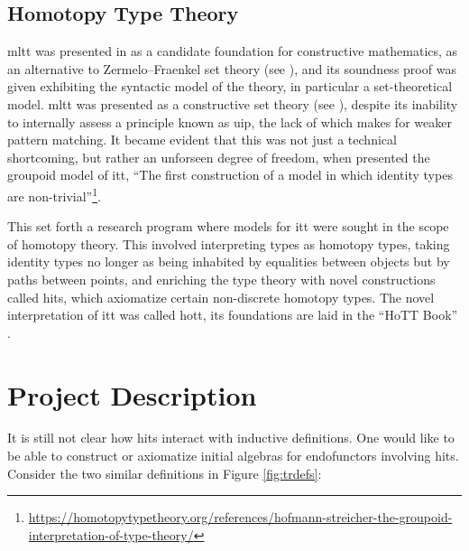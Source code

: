 \documentclass[a4paper]{article}
\begin{document}
\subsection{Homotopy Type Theory}

\Gls{mltt} was presented in \cite{MartinLoef1998} as a candidate foundation for constructive mathematics, as an alternative to Zermelo–Fraenkel set theory (see \cite[Introduction]{MartinLoef1998}), and its soundness proof was given exhibiting the syntactic model of the theory, in particular a set-theoretical model. \Gls{mltt} was presented as a constructive set theory (see \cite{Nordstroem1990}), despite its inability to internally assess a principle known as \gls{uip}, the lack of which makes for weaker pattern matching. It became evident that this was not just a technical shortcoming, but rather an unforseen degree of freedom, when \textcite{Hofmann1998} presented the groupoid model of \gls{itt}, ``The first construction of a model in which identity types are non-trivial''\footnote{\url{https://homotopytypetheory.org/references/hofmann-streicher-the-groupoid-interpretation-of-type-theory/}}.

This set forth a research program where models for \gls{itt} were sought in the scope of homotopy theory. This involved interpreting types as homotopy types, taking identity types no longer as being inhabited by equalities between objects but by paths between points, and enriching the type theory with novel constructions called \glspl{hit}, which axiomatize certain non-discrete homotopy types. The novel interpretation of \gls{itt} was called \gls{hott}, its foundations are laid in the ``HoTT Book'' \cite{UnivalentFoundationsProgram2013}.

\section{Project Description}

It is still not clear how \glspl{hit} interact with inductive definitions. One would like to be able to construct or axiomatize initial algebras for endofunctors involving \glspl{hit}. Consider the two similar definitions in Figure \ref{fig:trdefs}:
\end{document}

